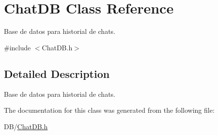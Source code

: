 \hypertarget{class_chat_d_b}{}\section{Chat\+D\+B Class Reference}
\label{class_chat_d_b}


Base de datos para historial de chats.  




{\ttfamily \#include $<$Chat\+D\+B.\+h$>$}



\subsection{Detailed Description}
Base de datos para historial de chats. 

The documentation for this class was generated from the following file\+:\begin{DoxyCompactItemize}
\item 
D\+B/\hyperlink{_chat_d_b_8h}{Chat\+D\+B.\+h}\end{DoxyCompactItemize}
